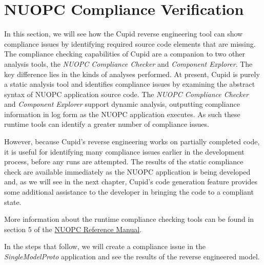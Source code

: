 \documentclass[oneside,11pt]{memoir}
\begin{document}
\section{NUOPC Compliance Verification}

In this section, we will see how the Cupid reverse engineering tool can show compliance issues by identifying required source code elements that are missing.  The compliance checking capabilities of Cupid are a companion to two other analysis tools, the \emph{NUOPC Compliance Checker} and \emph{Component Explorer}. The key difference lies in the kinds of analyses performed. At present, Cupid is purely a static analysis tool and identifies compliance issues by examining the abstract syntax of NUOPC application source code. The \emph{NUOPC Compliance Checker} and \emph{Component Explorer} support dynamic analysis, outputting compliance information in log form as the NUOPC application executes.  As such these runtime tools can identify a greater number of compliance issues.  

However, because Cupid's reverse engineering works on partially completed code, it is useful for identifying many compliance issues earlier in the development process, before any runs are attempted. The results of the static compliance check are available immediately as the NUOPC application is being developed and, as we will see in the next chapter, Cupid's code generation feature provides some additional assistance to the developer in bringing the code to a compliant state.

More information about the runtime compliance checking tools can be found in section 5 of the \href{http://www.earthsystemmodeling.org/esmf_releases/public/ESMF\_6\_3\_0r/NUOPC_refdoc/node6.html}{NUOPC Reference Manual}.

In the steps that follow, we will create a compliance issue in the \emph{SingleModelProto} application and see the results of the reverse engineered model.
\end{document}
